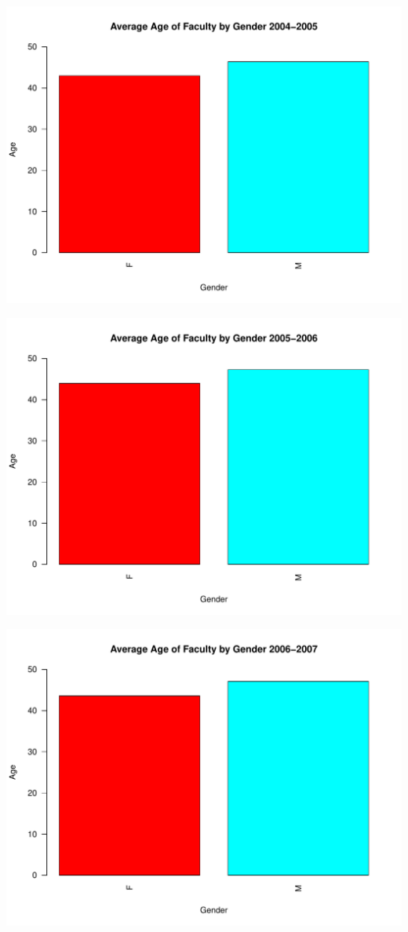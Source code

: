 \documentclass[12pt,a4paper]{article}\usepackage[]{graphicx}\usepackage[]{color}
\makeatletter
\def\maxwidth{ %
  \ifdim\Gin@nat@width>\linewidth
    \linewidth
  \else
    \Gin@nat@width
  \fi
}
\newenvironment{knitrout}{}{} %
\theoremstyle{definition}
\makeatother
\begin{document}
\begin{knitrout}
\color{fgcolor}
\includegraphics[width=\maxwidth]{figure/unnamed-chunk-11-1} 

\includegraphics[width=\maxwidth]{figure/unnamed-chunk-11-2} 

\includegraphics[width=\maxwidth]{figure/unnamed-chunk-11-3} 


\end{knitrout}
\end{document}
